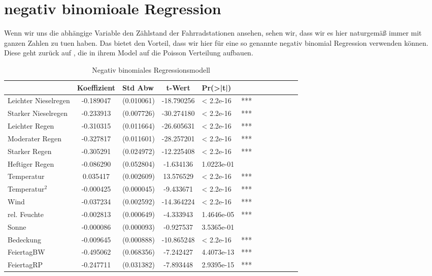 \documentclass[a4paper,12pt]{thesis}
\begin{document}
\section{negativ binomioale Regression}

Wenn wir uns die abhängige Variable den Zählstand der Fahrradstationen ansehen, sehen wir, dass wir es hier naturgemäß immer mit ganzen Zahlen zu tuen haben. Das bietet den Vorteil, dass wir hier für eine so genannte negativ binomial Regression verwenden können. Diese geht zurück auf \cite{Hausman1984}, die in ihrem Model auf die Poisson Verteilung aufbauen.


\begin{table}[!ht]
	\centering
	\caption{Negativ binomiales Regressionsmodell}
	\begin{tabular}[t]{lc lc lc lc lc lc}
		\toprule
		& Koeffizient & Std Abw & t-Wert & Pr(>|t|) & \\
		\midrule
		Leichter Nieselregen & -0.189047 & (0.010061) & -18.790256 & < 2.2e-16 & *** \\
		Starker Nieselregen & -0.233913 & (0.007726) & -30.274180 & < 2.2e-16 & *** \\
		Leichter Regen & -0.310315 & (0.011664) & -26.605631 & < 2.2e-16 & *** \\
		Moderater Regen & -0.327817 & (0.011601) & -28.257201 & < 2.2e-16 & *** \\
		Starker Regen & -0.305291 & (0.024972) & -12.225408 & < 2.2e-16 & *** \\
		Heftiger Regen & -0.086290 & (0.052804) & -1.634136 & 1.0223e-01 & \\
		Temperatur & 0.035417 & (0.002609) & 13.576529 & < 2.2e-16 & *** \\
		Temperatur$^2$ & -0.000425 & (0.000045) & -9.433671 & < 2.2e-16 & *** \\
		Wind & -0.037234 & (0.002592) & -14.364224 & < 2.2e-16 & *** \\
		rel. Feuchte & -0.002813 & (0.000649) & -4.333943 & 1.4646e-05 & *** \\
		Sonne & -0.000086 & (0.000093) & -0.927537 & 3.5365e-01 & \\
		Bedeckung & -0.009645 & (0.000888) & -10.865248 & < 2.2e-16 & *** \\
		FeiertagBW & -0.495062 & (0.068356) & -7.242427 & 4.4073e-13 & *** \\
		FeiertagRP & -0.247711 & (0.031382) & -7.893448 & 2.9395e-15 & *** \\

\end{tabular}
\end{table}
\end{document}
